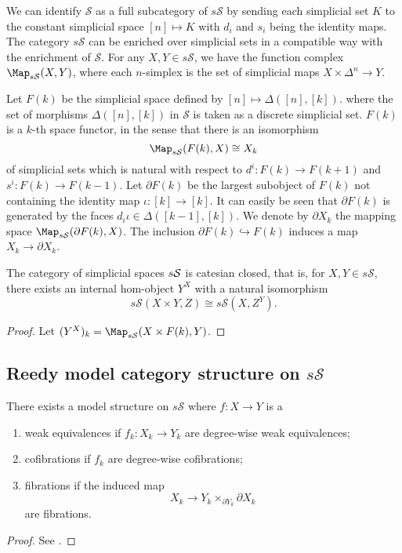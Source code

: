 We can identify $\mathcal S$ as a full subcategory of $s\mathcal S$ by sending each simplicial set $K$ to the constant simplicial space $[n]\mapsto K$ with $d_i$ and $s_i$ being the identity maps. The category $s\mathcal S$ can be enriched over simplicial sets in a compatible way with the enrichment of $\mathcal S$. For any $X,Y\in s\mathcal S$, we have the function complex $\Map_{s\mathcal S}(X,Y)$, where each $n$-simplex is the set of simplicial maps $X\times\Delta^n\to Y$.

Let $F(k)$ be the simplicial space defined by $[n]\mapsto \Delta([n],[k])$. where the set of morphisms $\Delta([n],[k])$ in $\mathcal S$ is taken as a discrete simplicial set. $F(k)$ is a $k$-th space functor, in the sense that there is an isomorphism
$$\Map_{s\mathcal S}(F(k),X)\cong X_k$$
of simplicial sets which is natural with respect to $d^i:F(k)\to F(k+1)$ and $s^i:F(k)\to F(k-1)$.
Let $\partial F(k)$ be the largest subobject of $F(k)$ not containing the identity map $\iota:[k]\to[k]$. It can easily be seen that $\partial F(k)$ is generated by the faces $d_i\iota\in\Delta([k-1],[k])$. We denote by $\partial X_k$ the mapping space $\Map_{s\mathcal S}(\partial F(k),X)$. The inclusion $\partial F(k)\hookrightarrow F(k)$ induces a map $X_k\to\partial X_k$.

\begin{prop}
The category of simplicial spaces $s\cal S$ is catesian closed, that is, for $X,Y\in s\mathcal S$, there exists an internal hom-object $Y^X$ with a natural isomorphism
$$s\mathcal S(X\times Y,Z)\cong s\mathcal S(X,Z^Y).$$
\end{prop}
\begin{proof}
Let $(Y^X)_k=\Map_{s\mathcal S}(X\times F(k),Y)$.
\end{proof}

\subsection{Reedy model category structure on $s\mathcal S$}
\begin{thm}
There exists a model structure on $s\mathcal S$ where $f:X\to Y$ is a
\begin{enumerate}
\item weak equivalences if $f_k:X_k\to Y_k$ are degree-wise weak equivalences;
\item cofibrations if $f_k$ are degree-wise cofibrations;
\item fibrations if the induced map
\begin{equation} \label{Reedyfib}
X_k\to Y_k\times_{\partial Y_k}\partial X_k
\end{equation}
are fibrations.
\end{enumerate}
\end{thm}
\begin{proof}
See \cite[IV.3.2]{gj}.
\end{proof}

